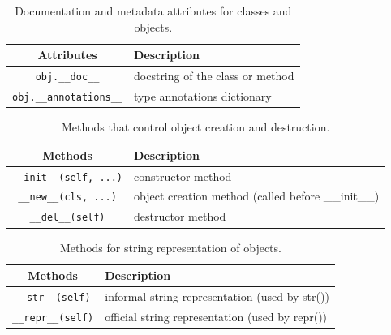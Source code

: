   \begin{definition}
    \label{def:documentation-and-metadata}
    \begin{table}[H]
      \centering
      \begin{tabular}{|c|p{8cm}|}
        \hline
        \textbf{Attributes} & \textbf{Description} \\
        \hline 
        \texttt{obj.\_\_doc\_\_} & docstring of the class or method \\
        \hline
        \texttt{obj.\_\_annotations\_\_} & type annotations dictionary \\
        \hline
      \end{tabular}
      \caption{Documentation and metadata attributes for classes and objects.}
      \label{tab:documentation_metadata}
    \end{table}
  \end{definition}

  \begin{definition}
    \label{def:object-lifecycle}
    \begin{table}[H]
      \centering
      \begin{tabular}{|c|p{8cm}|}
        \hline
        \textbf{Methods} & \textbf{Description} \\
        \hline 
        \texttt{\_\_init\_\_(self, ...)} & constructor method \\
        \hline
        \texttt{\_\_new\_\_(cls, ...)} & object creation method (called before \_\_init\_\_) \\
        \hline
        \texttt{\_\_del\_\_(self)} & destructor method \\
        \hline
      \end{tabular}
      \caption{Methods that control object creation and destruction.}
      \label{tab:object_lifecycle}
    \end{table}
  \end{definition}

  \begin{definition}
    \label{def:string-representation}
    \begin{table}[H]
      \centering
      \begin{tabular}{|c|p{8cm}|}
        \hline
        \textbf{Methods} & \textbf{Description} \\
        \hline 
        \texttt{\_\_str\_\_(self)} & informal string representation (used by str()) \\
        \hline
        \texttt{\_\_repr\_\_(self)} & official string representation (used by repr()) \\
        \hline
      \end{tabular}
      \caption{Methods for string representation of objects.}
      \label{tab:string_representation}
    \end{table}
  \end{definition}


